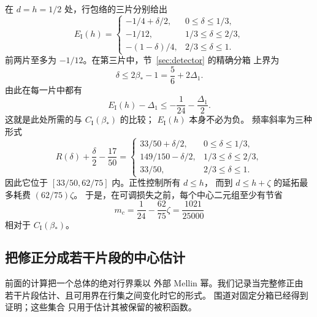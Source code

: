在 $d=h=1/2$ 处，行包络的三片分别给出
\[
 E_{\mathrm I}(h)=
 \begin{cases}
  -1/4+\delta/2,&0\le\delta\le1/3,\\
  -1/12,&1/3\le\delta\le2/3,\\
  -(1-\delta)/4,&2/3\le\delta\le1.
 \end{cases}
\]
前两片至多为 $-1/12$。在第三片中，节~\ref{sec:detector} 的精确分箱
上界为
\[
 \delta\le2\beta_*-1=\frac56+2\Delta_1.
\]
由此在每一片中都有
\[
 E_{\mathrm I}(h)-\Delta_1
 \le-\frac1{24}-\frac{\Delta_1}{2}.
\]
这就是此处所需的与 $C_{\mathrm I}(\beta_*)$ 的比较；
$E_{\mathrm I}(h)$ 本身不必为负。
频率斜率为三种形式
\[
 R(\delta)+\frac\delta2-\frac{17}{50}
 =\begin{cases}
  33/50+\delta/2,&0\le\delta\le1/3,\\
  149/150-\delta/2,&1/3\le\delta\le2/3,\\
  33/50,&2/3\le\delta\le1.
 \end{cases}
\]
因此它位于 $[33/50,62/75]$ 内。正性控制所有 $d\le h$，
而到 $d\le h+\zeta$ 的延拓最多耗费 $(62/75)\zeta$。
于是，在可调损失之前，每个中心二元组至少有节省
\[
 m_c=\frac1{24}-\frac{62}{75}\zeta=\frac{1021}{25000}
\]
相对于 $C_{\mathrm I}(\beta_*)$。

\subsection{把修正分成若干片段的中心估计}

前面的计算把一个总体的绝对行界乘以
外部 Mellin 幂。我们记录当完整修正由
若干片段估计、且可用界在行集之间变化时它的形式。
围道对固定分箱已经得到证明；这些集合
只用于估计其被保留的被积函数。

